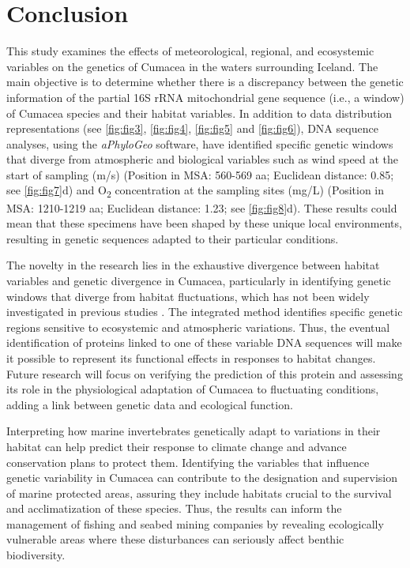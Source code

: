 \section{Conclusion}\label{conclusion}
This study examines the effects of meteorological, regional, and ecosystemic variables on the genetics of Cumacea in the waters surrounding Iceland. The main objective is to determine whether there is a discrepancy between the genetic information of the partial 16S rRNA mitochondrial gene sequence (i.e., a window) of Cumacea species and their habitat variables. In addition to data distribution representations (see \autoref{fig:fig3}, \autoref{fig:fig4}, \autoref{fig:fig5} and \autoref{fig:fig6}), DNA sequence analyses, using the \textit{aPhyloGeo} software, have identified specific genetic windows that diverge from atmospheric and biological variables such as wind speed at the start of sampling (m/s) (Position in MSA: 560-569 aa; Euclidean distance: 0.85; see \autoref{fig:fig7}d) and O\textsubscript{2} concentration at the sampling sites (mg/L) (Position in MSA: 1210-1219 aa; Euclidean distance: 1.23; see \autoref{fig:fig8}d). These results could mean that these specimens have been shaped by these unique local environments, resulting in genetic sequences adapted to their particular conditions.

The novelty in the research lies in the exhaustive divergence between habitat variables and genetic divergence in Cumacea, particularly in identifying genetic windows that diverge from habitat fluctuations, which has not been widely investigated in previous studies \citep{manel2003landscape, vrijenhoek2009cryptic}. The integrated method identifies specific genetic regions sensitive to ecosystemic and atmospheric variations. Thus, the eventual identification of proteins linked to one of these variable DNA sequences will make it possible to represent its functional effects in responses to habitat changes. Future research will focus on verifying the prediction of this protein and assessing its role in the physiological adaptation of Cumacea to fluctuating conditions, adding a link between genetic data and ecological function.

Interpreting how marine invertebrates genetically adapt to variations in their habitat can help predict their response to climate change and advance conservation plans to protect them. Identifying the variables that influence genetic variability in Cumacea can contribute to the designation and supervision of marine protected areas, assuring they include habitats crucial to the survival and acclimatization of these species. Thus, the results can inform the management of fishing and seabed mining companies by revealing ecologically vulnerable areas where these disturbances can seriously affect benthic biodiversity.

